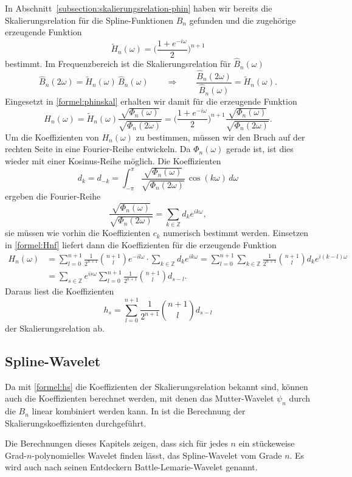 In Abschnitt~\ref{subsection:skalierungsrelation-phin} haben wir bereits
die Skalierungsrelation für die Spline-Funktionen $B_n$ gefunden und die
zugehörige erzeugende Funktion
\[
\tilde{H}_n(\omega) = \biggl(\frac{1+e^{-i\omega}}{2}\biggr)^{n+1}
\]
bestimmt.
Im Frequenzbereich ist die Skalierungsrelation für $\hat{B}_n(\omega)$
\[
\hat{B}_n(2\omega)=\tilde{H}_n(\omega) \, \hat{B}_n(\omega)
\qquad\Rightarrow\qquad
\frac{\hat{B}_n(2\omega)}{\hat{B}_n(\omega)}
=
\tilde{H}_n(\omega).
\]
Eingesetzt in \eqref{formel:phinskal} erhalten wir damit für die 
erzeugende Funktion 
\begin{equation}
H_n(\omega)
=
\tilde{H}_n(\omega)
\frac{\sqrt{\Phi_n(\omega)}}{\sqrt{\Phi_n(2\omega)}}
=
\biggl(
\frac{1+e^{-i\omega}}{2}
\biggr)^{n+1}
\frac{\sqrt{\Phi_n(\omega)}}{\sqrt{\Phi_n(2\omega)}}.
\label{formel:Hnf}
\end{equation}
Um die Koeffizienten von $H_n(\omega)$ zu bestimmen, müssen wir den
Bruch auf der rechten Seite in eine Fourier-Reihe entwickeln.
Da $\Phi_n(\omega)$ gerade ist, ist dies wieder mit einer Kosinus-Reihe
möglich.
Die Koeffizienten
\[
d_k
=
d_{-k}
=
\int_{-\pi}^\pi
\frac{\sqrt{\Phi_n(\omega)}}{\sqrt{\Phi_n(2\omega)}}
\,\cos(k\omega)
\,d\omega
\]
ergeben die Fourier-Reihe
\[
\frac{\sqrt{\Phi_n(\omega)}}{\sqrt{\Phi_n(2\omega)}}
=
\sum_{k\in\mathbb Z} d_k e^{ik\omega},
\]
sie müssen wie vorhin die Koeffizienten $c_k$ numerisch bestimmt werden.
Einsetzen in \eqref{formel:Hnf} liefert dann die Koeffizienten für die
erzeugende Funktion
\begin{align*}
H_n(\omega)
&=
\sum_{l=0}^{n+1} \frac1{2^{n+1}} \binom{n+1}{l} e^{-il\omega}
\cdot
\sum_{k\in\mathbb Z} d_ke^{ik\omega}
=
\sum_{l=0}^{n+1}
\sum_{k\in\mathbb Z}
\frac{1}{2^{n+1}}
\binom{n+1}{l}d_k
e^{i(k-l)\omega}
\\
&=
\sum_{s\in\mathbb Z}
e^{is\omega}
\sum_{l=0}^{n+1}
\frac{1}{2^{n+1}}
\binom{n+1}{l}d_{s-l}.
\end{align*}
Daraus liest die Koeffizienten
\begin{equation}
h_s
= 
\sum_{l=0}^{n+1}
\frac{1}{2^{n+1}}
\binom{n+1}{l}d_{s-l}
\label{formel:hs}
\end{equation}
der Skalierungsrelation ab.

\subsection{Spline-Wavelet
\label{subsection:spline-wavelet}}
Da mit \eqref{formel:hs} die Koeffizienten der Skalierungsrelation bekannt
sind, können auch die Koeffizienten berechnet werden, mit denen das
Mutter-Wavelet $\psi_n$ durch die $B_n$ linear kombiniert werden kann.
In \cite{buch:blatter} ist die Berechnung der Skalierungskoeffizienten 
durchgeführt.

Die Berechnungen dieses Kapitels zeigen, dass sich für jedes $n$ ein 
stückeweise Grad-$n$-po\-ly\-no\-mi\-elles Wavelet finden lässt,
das Spline-Wavelet vom Grade $n$.
Es wird auch nach seinen Entdeckern Battle-Lemarie-Wavelet genannt.





